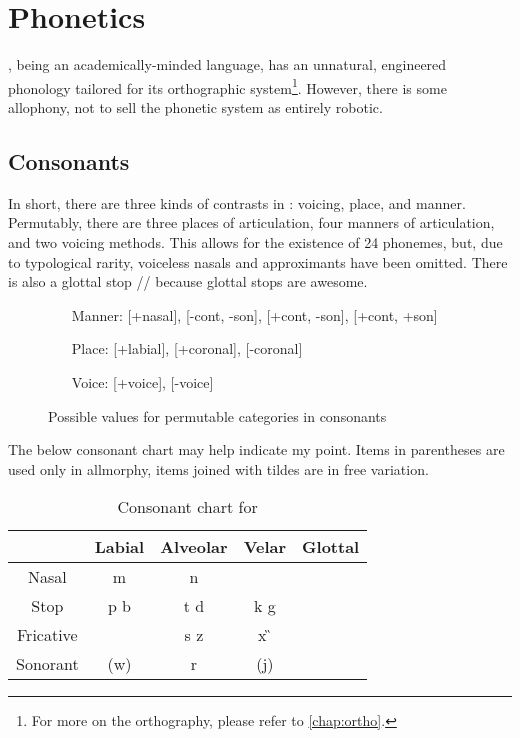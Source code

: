 \chapter{Phonetics}
\label{chap:phone}

\kurango, being an academically-minded language, has an unnatural, engineered phonology tailored for its orthographic system\footnote{For more on the orthography, please refer to \autoref{chap:ortho}.}. However, there is some allophony, not to sell the phonetic system as entirely robotic.

\section{Consonants}
In short, there are three kinds of contrasts in \kurango: voicing, place, and manner. Permutably, there are three places of articulation, four manners of articulation, and two voicing methods. This allows for the existence of 24 phonemes, but, due to typological rarity, voiceless nasals and approximants have been omitted. There is also a glottal stop /\glot/ because glottal stops are awesome.

	\begin{figure}[H]
	\label{permute_cons}
	\begin{enumerate}
	\centering
		\item[Manner:] [+nasal], [-cont, -son], [+cont, -son], [+cont, +son]
		\item[Place:] [+labial], [+coronal], [-coronal]
		\item[Voice:] [+voice], [-voice]
	\end{enumerate}

	\begin{center}
		\caption{Possible values for permutable categories in {\kurango} consonants}
	\end{center}
	\end{figure}

The below consonant chart may help indicate my point. Items in parentheses are used only in allmorphy, items joined with tildes are in free variation.
	
	\begin{table}[H]
	\centering
	\caption{Consonant chart for \kurango}
	\label{conschart}
		\begin{tabular}{ccccc}
		 & Labial & Alveolar & Velar & Glottal \\ \hline\hline
		Nasal & m & n & \N & \\ \hline
		Stop & p b & t d & k g & \glot \\ \hline
		Fricative & {\F} \B & s z & x \G & \\ \hline
		Sonorant & {\W} (w) & \R\tild\textipa{\*r}\tild r &{\M} (j\footnotemark) & \\ \hline\hline
		\end{tabular}
	\end{table}


